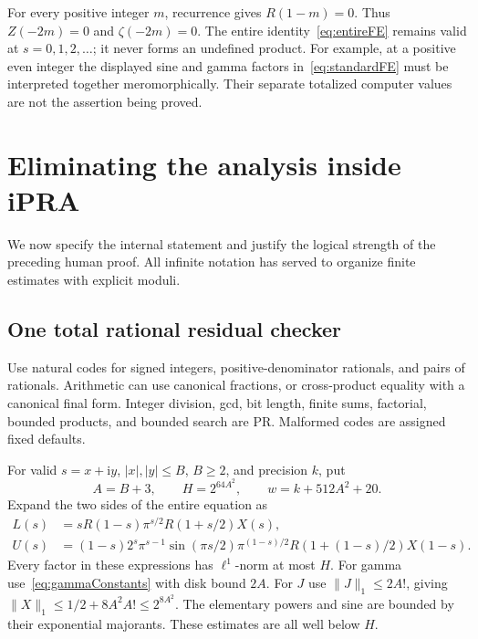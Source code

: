 \documentclass[11pt,letterpaper]{article}
\numberwithin{equation}{section}
\theoremstyle{definition}
\newcommand{\ii}{\mathrm i}
\newcommand{\normone}[1]{\lVert #1\rVert_1}
\newcommand{\gamrec}{R}
\begin{document}
For every positive integer \(m\), recurrence gives
\(\gamrec(1-m)=0\). Thus \(Z(-2m)=0\) and
\(\zeta(-2m)=0\).
The entire identity~\eqref{eq:entireFE} remains valid at
\(s=0,1,2,\ldots\); it never forms an undefined product.
For example, at a positive even integer the displayed sine and
gamma factors in~\eqref{eq:standardFE} must be interpreted together
meromorphically. Their separate totalized computer values are not
the assertion being proved.

\section{Eliminating the analysis inside iPRA}\label{sec:arithmetic}

We now specify the internal statement and justify the logical strength
of the preceding human proof. All infinite notation has served to
organize finite estimates with explicit moduli.

\subsection{One total rational residual checker}

Use natural codes for signed integers, positive-denominator rationals,
and pairs of rationals. Arithmetic can use canonical fractions, or
cross-product equality with a canonical final form. Integer
division, gcd, bit length, finite sums, factorial, bounded
products, and bounded search are PR. Malformed codes are assigned
fixed defaults.

For valid \(s=x+\ii y\), \(|x|,|y|\le B\), \(B\ge2\), and
precision \(k\), put
\begin{equation}
       A=B+3,\qquad H=2^{64A^2},\qquad
       w=k+512A^2+20.                                    \label{eq:workingprecision}
\end{equation}
Expand the two sides of the entire equation as
\begin{align}
 L(s)&=s\gamrec(1-s)\pi^{s/2}\gamrec(1+s/2)X(s),\nonumber\\
 U(s)&=(1-s)2^s\pi^{s-1}\sin(\pi s/2)
       \pi^{(1-s)/2}\gamrec(1+(1-s)/2)X(1-s).
 \label{eq:expandedFE}
\end{align}
Every factor in these expressions has \(\ell^1\)-norm at most \(H\).
For gamma use~\eqref{eq:gammaConstants} with disk bound \(2A\).
For \(J\) use \(\normone{J}\le2A!\), giving
\(\normone X\le1/2+8A^2A!\le2^{8A^2}\).
The elementary powers and sine are bounded by their exponential
majorants. These estimates are all well below \(H\).
\end{document}
